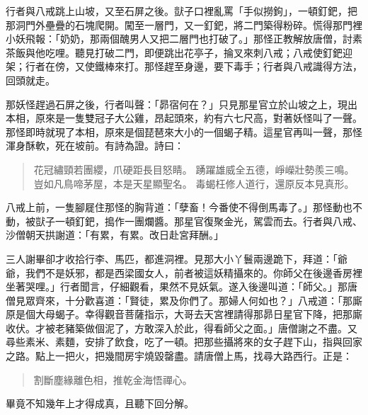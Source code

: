 行者與八戒跳上山坡，又至石屏之後。獃子口裡亂罵「手似撈鉤」，一頓釘鈀，把那洞門外壘疊的石塊爬開。闖至一層門，又一釘鈀，將二門築得粉碎。慌得那門裡小妖飛報：「奶奶，那兩個醜男人又把二層門也打破了。」那怪正教解放唐僧，討素茶飯與他吃哩。聽見打破二門，即便跳出花亭子，掄叉來刺八戒；八戒使釘鈀迎架；行者在傍，又使鐵棒來打。那怪趕至身邊，要下毒手；行者與八戒識得方法，回頭就走。

那妖怪趕過石屏之後，行者叫聲：「昴宿何在？」只見那星官立於山坡之上，現出本相，原來是一隻雙冠子大公雞，昂起頭來，約有六七尺高，對著妖怪叫了一聲。那怪即時就現了本相，原來是個琵琶來大小的一個蝎子精。這星官再叫一聲，那怪渾身酥軟，死在坡前。有詩為證。詩曰：
\begin{quote}
花冠繡頸若團纓，爪硬距長目怒睛。
踴躍雄威全五德，崢嶸壯勢羨三鳴。
豈如凡鳥啼茅屋，本是天星顯聖名。
毒蝎枉修人道行，還原反本見真形。
\end{quote}

八戒上前，一隻腳屣住那怪的胸背道：「孽畜！今番使不得倒馬毒了。」那怪動也不動，被獃子一頓釘鈀，搗作一團爛醬。那星官復聚金光，駕雲而去。行者與八戒、沙僧朝天拱謝道：「有累，有累。改日赴宮拜酬。」

三人謝畢卻才收拾行李、馬匹，都進洞裡。見那大小丫鬟兩邊跪下，拜道：「爺爺，我們不是妖邪，都是西梁國女人，前者被這妖精攝來的。你師父在後邊香房裡坐著哭哩。」行者聞言，仔細觀看，果然不見妖氣。遂入後邊叫道：「師父。」那唐僧見眾齊來，十分歡喜道：「賢徒，累及你們了。那婦人何如也？」八戒道：「那廝原是個大母蝎子。幸得觀音菩薩指示，大哥去天宮裡請得那昴日星官下降，把那廝收伏。才被老豬築做個泥了，方敢深入於此，得看師父之面。」唐僧謝之不盡。又尋些素米、素麵，安排了飲食，吃了一頓。把那些攝將來的女子趕下山，指與回家之路。點上一把火，把幾間房宇燒毀罄盡。請唐僧上馬，找尋大路西行。正是：
\begin{quote}
割斷塵緣離色相，推乾金海悟禪心。
\end{quote}

畢竟不知幾年上才得成真，且聽下回分解。
